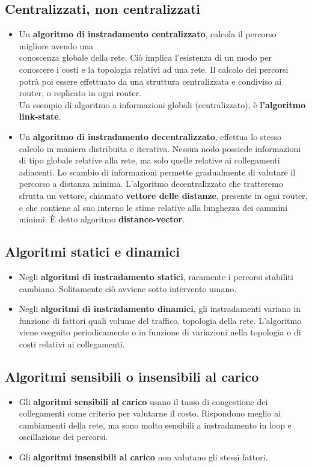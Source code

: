 \subsection{Centralizzati, non centralizzati}
\begin{itemize}
	\item Un \textbf{algoritmo di instradamento centralizzato}, calcola il percorso migliore avendo una\\ conoscenza globale della rete. Ciò implica l'esistenza di un modo per conoscere i costi e la topologia relativi ad una rete. Il calcolo dei percorsi potrà poi essere effettuato da una struttura centralizzata e condiviso ai router, o replicato in ogni router.\\
	Un esempio di algoritmo a informazioni globali (centralizzato), è \textbf{l'algoritmo link-state}.
	
	\item Un \textbf{algoritmo di instradamento decentralizzato}, effettua lo stesso calcolo in maniera distribuita e iterativa. Nessun nodo possiede informazioni di tipo globale relative alla rete, ma solo quelle relative ai collegamenti adiacenti. Lo scambio di informazioni permette gradualmente di valutare il percorso a distanza minima. L'algoritmo decentralizzato che tratteremo sfrutta un vettore, chiamato \textbf{vettore delle distanze}, presente in ogni router, e che contiene al suo interno le stime relative alla lunghezza dei cammini minimi. È detto algoritmo \textbf{distance-vector}.
\end{itemize}

\subsection{Algoritmi statici e dinamici}
\begin{itemize}
	\item Negli \textbf{algoritmi di instradamento statici}, raramente i percorsi stabiliti cambiano. Solitamente ciò avviene sotto intervento umano.
	\item Negli \textbf{algoritmi di instradamento dinamici}, gli instradamenti variano in funzione di fattori quali volume del traffico, topologia della rete. L'algoritmo viene eseguito periodicamente o in funzione di variazioni nella topologia o di costi relativi ai collegamenti.
\end{itemize}
\newpage

\subsection{Algoritmi sensibili o insensibili al carico}
\begin{itemize}
	\item Gli \textbf{algoritmi sensibili al carico} usano il tasso di congestione dei collegamenti come criterio per valutarne il costo. Rispondono meglio ai cambiamenti della rete, ma sono molto sensibili a instradamento in loop e oscillazione dei percorsi.
	
	\item Gli \textbf{algoritmi insensibili al carico} non valutano gli stessi fattori.
\end{itemize}


